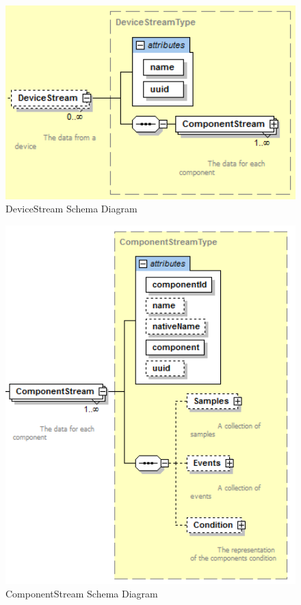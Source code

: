 \FloatBarrier


\begin{figure}[ht]
  \centering
    \includegraphics[width=1.0\textwidth]{figures/DeviceStream Schema.png}
  \caption{DeviceStream Schema Diagram}
  \label{fig:DeviceStream Schema Diagram}
\end{figure}

\FloatBarrier


\begin{figure}[ht]
  \centering
    \includegraphics[width=1.0\textwidth]{figures/ComponentStream Schema.png}
  \caption{ComponentStream Schema Diagram}
  \label{fig:ComponentStream Schema Diagram}
\end{figure}

